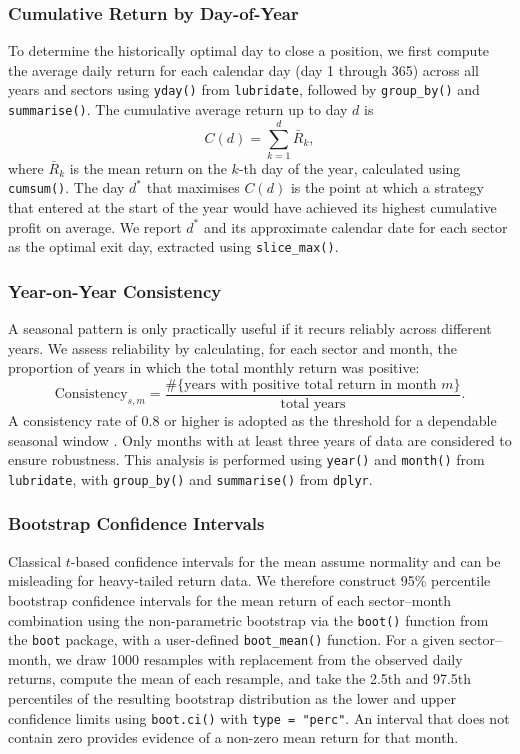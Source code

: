 \documentclass[12pt,a4paper,fleqn]{article}
\begin{document}
\subsubsection{Cumulative Return by Day-of-Year}

To determine the historically optimal day to close a position, we first compute the average daily return for each calendar day (day 1 through 365) across all years and sectors using \texttt{yday()} from \texttt{lubridate}, followed by \texttt{group\_by()} and \texttt{summarise()}. The cumulative average return up to day \(d\) is
\[
C(d) = \sum_{k=1}^{d} \bar{R}_k,
\]
where \(\bar{R}_k\) is the mean return on the \(k\)-th day of the year, calculated using \texttt{cumsum()}. The day \(d^*\) that maximises \(C(d)\) is the point at which a strategy that entered at the start of the year would have achieved its highest cumulative profit on average. We report \(d^*\) and its approximate calendar date for each sector as the optimal exit day, extracted using \texttt{slice\_max()}.

\subsubsection{Year-on-Year Consistency}

A seasonal pattern is only practically useful if it recurs reliably across different years. We assess reliability by calculating, for each sector and month, the proportion of years in which the total monthly return was positive:
\[
\text{Consistency}_{s,m} = \frac{\#\{\text{years with positive total return in month } m\}}{\text{total years}}.
\]
A consistency rate of \(0.8\) or higher is adopted as the threshold for a dependable seasonal window \cite{lakonishok1988seasonal}. Only months with at least three years of data are considered to ensure robustness. This analysis is performed using \texttt{year()} and \texttt{month()} from \texttt{lubridate}, with \texttt{group\_by()} and \texttt{summarise()} from \texttt{dplyr}.

\subsubsection{Bootstrap Confidence Intervals}

Classical \(t\)-based confidence intervals for the mean assume normality and can be misleading for heavy-tailed return data. We therefore construct 95\% percentile bootstrap confidence intervals for the mean return of each sector–month combination using the non-parametric bootstrap \cite{efron1994introduction} via the \texttt{boot()} function from the \texttt{boot} package, with a user-defined \texttt{boot\_mean()} function. For a given sector–month, we draw 1000 resamples with replacement from the observed daily returns, compute the mean of each resample, and take the 2.5th and 97.5th percentiles of the resulting bootstrap distribution as the lower and upper confidence limits using \texttt{boot.ci()} with \texttt{type = "perc"}. An interval that does not contain zero provides evidence of a non-zero mean return for that month.
\end{document}

